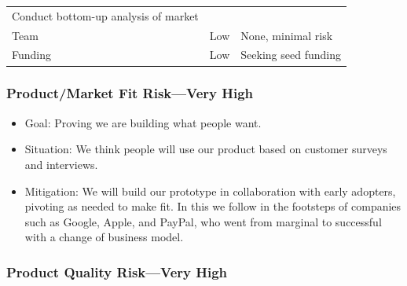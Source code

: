 \documentclass[11pt,openany]{book}
\providecommand{\tightlist}{%
  \setlength{\itemsep}{0pt}\setlength{\parskip}{0pt}}
\begin{document}
\begin{longtable}[]{@{}lcl@{}}
\begin{minipage}[t]{0.49\columnwidth}
Conduct bottom-up analysis of market\strut
\end{minipage}\tabularnewline
\begin{minipage}[t]{0.26\columnwidth}\raggedright
Team\strut
\end{minipage} & \begin{minipage}[t]{0.16\columnwidth}\centering
Low\strut
\end{minipage} & \begin{minipage}[t]{0.49\columnwidth}\raggedright
None, minimal risk\strut
\end{minipage}\tabularnewline
\begin{minipage}[t]{0.26\columnwidth}\raggedright
Funding\strut
\end{minipage} & \begin{minipage}[t]{0.16\columnwidth}\centering
Low\strut
\end{minipage} & \begin{minipage}[t]{0.49\columnwidth}\raggedright
Seeking seed funding\strut
\end{minipage}\tabularnewline
\bottomrule
\end{longtable}

\hypertarget{productmarket-fit-riskvery-high}{%
\subsubsection{Product/Market Fit Risk---Very
High}\label{productmarket-fit-riskvery-high}}

\begin{itemize}
\tightlist
\item
  Goal: Proving we are building what people want.
\item
  Situation: We think people will use our product based on customer
  surveys and interviews.
\item
  Mitigation: We will build our prototype in collaboration with early
  adopters, pivoting as needed to make fit. In this we follow in the
  footsteps of companies such as Google, Apple, and PayPal, who went
  from marginal to successful with a change of business model.
\end{itemize}

\hypertarget{product-quality-riskvery-high}{%
\subsubsection{Product Quality Risk---Very
High}\label{product-quality-riskvery-high}}
\end{document}
